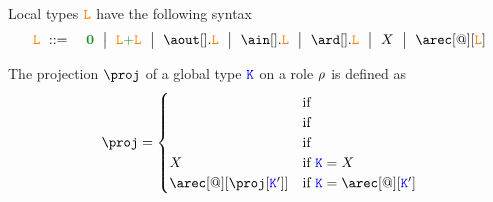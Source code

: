 Local types $\texttt{\textcolor{orange}L}$ have the following syntax
\begin{eqnarray*}
  \aL & \bnfdef & \nil \bnfmid
                  \aL \chop \aL \bnfmid
                  \aout[].\aL \bnfmid
                  \ain[].\aL \bnfmid
                  \ard[].\aL \bnfmid
                  X \bnfmid
                  \arec[@][\aL]
\end{eqnarray*}

The projection $\proj$ of a global type $\texttt{\textcolor{blue}K}$ on a role $\rho$ is
defined as
\[
  \proj =
  \begin{cases}
    & \text{if } \\
    & \text{if } \\
    & \text{if } \\
    X & \text{if } \aK = X \\
    \arec[@][{\proj[\aK']}] & \text{if } \aK = \arec[@][\aK']
  \end{cases}
\]


